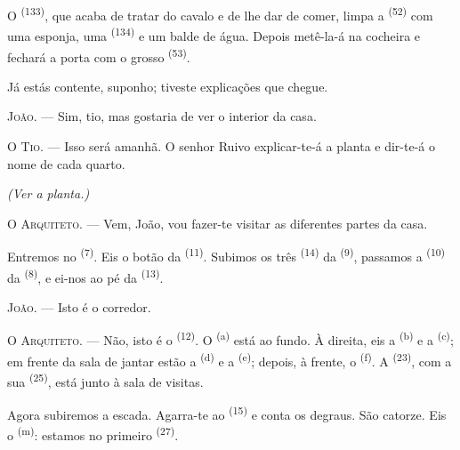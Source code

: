 O  \textsuperscript{(133)}, que acaba de tratar do
cavalo e de lhe dar de comer, limpa a  \textsuperscript{(52)}
com uma esponja, uma  \textsuperscript{(134)} e um balde de
água. Depois metê-la-á na cocheira e fechará a porta com o grosso
 \textsuperscript{(53)}.

Já estás contente, suponho; tiveste explicações que chegue.

\textsc{João}. --- Sim, tio, mas gostaria de ver o interior da casa.

\textsc{O Tio}. --- Isso será amanhã. O senhor Ruivo explicar-te-á a
planta e dir-te-á o nome de cada quarto.

\VUsaut{3.0mm}
\VUsaut{2.4mm}

{\centering\textit{(Ver a planta.)}\par}
\VUsaut{2.4mm}

\textsc{O Arquiteto}. --- Vem, João, vou fazer-te visitar as diferentes
partes da casa.

Entremos no  \textsuperscript{(7)}. Eis o botão da
 \textsuperscript{(11)}. Subimos os três 
\textsuperscript{(14)} da  \textsuperscript{(9)}, passamos a
 \textsuperscript{(10)} da 
\textsuperscript{(8)}, e ei-nos ao pé da  \textsuperscript{(13)}.

\textsc{João}. --- Isto é o corredor.

\textsc{O Arquiteto}. --- Não, isto é o  \textsuperscript{(12)}.
O  \textsuperscript{(a)} está ao fundo. À direita, eis a
 \textsuperscript{(b)} e a 
\textsuperscript{(c)}; em frente da sala de jantar estão a 
\textsuperscript{(d)} e a  \textsuperscript{(e)}; depois, à frente, o
 \textsuperscript{(f)}. A  \textsuperscript{(23)}, com
a sua  \textsuperscript{(25)}, está junto à sala de
visitas.

Agora subiremos a escada. Agarra-te ao 
\textsuperscript{(15)} e conta os degraus. São catorze. Eis o 
\textsuperscript{(m)}: estamos no primeiro  \textsuperscript{(27)}.

